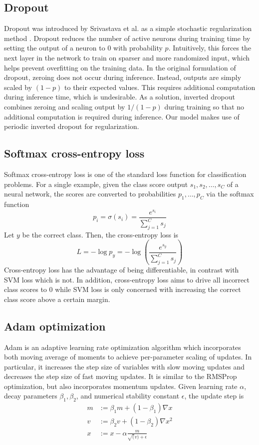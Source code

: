 \documentclass[10pt,twocolumn,letterpaper]{article}
\begin{document}
\subsection{Dropout}
Dropout was introduced by Srivastava et al. as a simple stochastic regularization method \cite{srivastava2014dropout}. Dropout reduces the number of active neurons during training time by setting the output of a neuron to 0 with probability $p$. Intuitively, this forces the next layer in the network to train on sparser and more randomized input, which helps prevent overfitting on the training data. In the original formulation of dropout, zeroing does not occur during inference. Instead, outputs are simply scaled by $(1 - p)$ to their expected values. This requires additional computation during inference time, which is undesirable. As a solution, inverted dropout combines zeroing and scaling output by $1 / (1 - p)$ during training so that no additional computation is required during inference. Our model makes use of periodic inverted dropout for regularization.


\subsection{Softmax cross-entropy loss}
Softmax cross-entropy loss is one of the standard loss function for classification problems. For a single example, given the class score output $s_1, s_2, \dots, s_C$ of a neural network, the scores are converted to probabilities $p_1, \dots, p_C$ via the softmax function $$p_i = \sigma(s_i) = \frac{e^{s_i}}{\sum_{j = 1}^C s_j}$$ Let $y$ be the correct class. Then, the cross-entropy loss is $$L = -\log p_y = -\log \left( \frac{e^{s_y}}{\sum_{j = 1}^C s_j} \right)$$ Cross-entropy loss has the advantage of being differentiable, in contrast with SVM loss which is not. In addition, cross-entropy loss aims to drive all incorrect class scores to 0 while SVM loss is only concerned with increasing the correct class score above a certain margin.

\subsection{Adam optimization}
Adam is an adaptive learning rate optimization algorithm which incorporates both moving average of moments to achieve per-parameter scaling of updates. In particular, it increases the step size of variables with slow moving updates and decreases the step size of fast moving updates. It is similar to the RMSProp optimization, but also incorporates momentum updates. Given learning rate $\alpha$, decay parameters $\beta_1, \beta_2$, and numerical stability constant $\epsilon$, the update step is
\begin{align}
m &:= \beta_1 m + (1 - \beta_1) \nabla x \\
v &:= \beta_2 v + (1 - \beta_2) \nabla x^2 \\
x &:= x - \alpha \frac{m}{\sqrt(v) + \epsilon}
\end{align}
\end{document}
